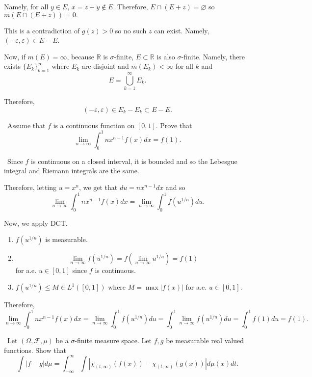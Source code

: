 \documentclass[12pt]{Homework}
\begin{document}
\begin{solution}
\begin{enumerate}[label=(\alph*)]
    Namely, for all $y\in E$, $x=z+y\notin E$. Therefore, $E\cap(E+z)=\varnothing$ so $m(E\cap (E+z))=0.$
    
    This is a contradiction of $g(z)>0$ so no such $z$ can exist. Namely, $(-\varepsilon,\varepsilon)\in E-E$.
    
    Now, if $m(E)=\infty$, because $\mathbb{R}$ is $\sigma$-finite, $E\subset\mathbb{R}$ is also $\sigma$-finite. Namely, there exists $\{E_k\}_{k=1}^\infty$ where $E_k$ are disjoint and $m(E_k)<\infty$ for all $k$ and $$E=\bigcup_{k=1}^\infty E_k.$$
    
    Therefore, $$(-\varepsilon,\varepsilon)\in E_k-E_k\subset E-E.$$
\end{enumerate}
\end{solution}
\newpage




\begin{problem} $\,$
Assume that $f$ is a continuous function on $[0,1]$. Prove that $$\lim_{n\to\infty}\int_0^1nx^{n-1}f(x)dx=f(1).$$
\end{problem}


\begin{solution}$\,$
Since $f$ is continuous on a closed interval, it is bounded and so the Lebesgue integral and Riemann integrals are the same.

Therefore, letting $u=x^n$, we get that $du=nx^{n-1}dx$ and so $$\lim_{n\to\infty}\int_0^1nx^{n-1}f(x)dx=\lim_{n\to\infty}\int_0^1f(u^{1/n})du.$$

Now, we apply DCT.
\begin{enumerate}
    \item $f(u^{1/n})$ is measurable.
    \item $$\lim_{n\to\infty}f(u^{1/n})=f\left(\lim_{n\to\infty}u^{1/n}\right)=f(1)$$ for a.e. $u\in[0,1]$ since $f$ is continuous. 
    \item $f(u^{1/n})\le M\in L^1([0,1])$ where $M=\max|f(x)|$ for a.e. $u\in[0,1].$
\end{enumerate}

Therefore, $$\lim_{n\to\infty}\int_0^1nx^{n-1}f(x)dx=\lim_{n\to\infty}\int_0^1f(u^{1/n})du=\int_0^1\lim_{n\to\infty}f(u^{1/n})du=\int_0^1f(1)du=f(1).$$
\end{solution}
\newpage



\begin{problem} $\,$
Let $(\Omega,\mathscr{F},\mu)$ be a $\sigma$-finite measure space. Let $f,g$ be measurable real valued functions. Show that $$\int|f-g|d\mu=\int_{-\infty}^\infty\int\left|\chi_{(t,\infty)}(f(x))-\chi_{(t,\infty)}(g(x))\right|d\mu(x)dt.$$
\end{problem}
\end{document}
